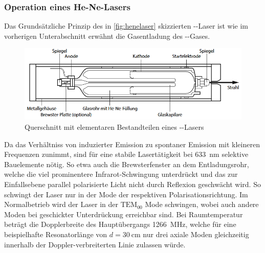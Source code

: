 \subsubsection{Operation eines He-Ne-Lasers}
Das Grundsätzliche Prinzip des in \autoref{fig:henelaser} skizzierten --Laser ist wie im vorherigen Unterabschnitt erwähnt die Gasentladung des --Gases.
\begin{figure}[H]
    \centering
    \includegraphics[scale=0.7]{Ressourcen/henelaser.png}
    \caption{Querschnitt mit elementaren Bestandteilen eines --Lasers\cite{eichler}}\label{fig:henelaser}
\end{figure}
Da das Verhältniss von induzierter Emission zu spontaner Emission mit kleineren Frequenzen zunimmt, sind für eine stabile Lasertätigkeit bei \SI{633}{\nano\meter} selektive Bauelemente nötig.
So etwa auch die Brewsterfenster an dem Entladungsrohr, welche die viel prominentere Infrarot-Schwingung unterdrückt und das zur Einfallsebene parallel polarisierte Licht nicht durch Reflexion geschwächt wird. So schwingt der Laser nur in der Mode der respektiven Polarisationsrichtung.
Im Normalbetrieb wird der Laser in der $\mathrm{TEM_{00}}$ Mode schwingen, wobei auch andere Moden bei geschickter Unterdrückung erreichbar sind. Bei Raumtemperatur beträgt die Dopplerbreite des Hauptübergangs \SI{1266}{\mega\hertz}, welche für eine beispielhafte Resonatorlänge von $d=\SI{30}{\centi\meter}$ nur drei axiale Moden gleichzeitig innerhalb der Doppler-verbreiterten Linie zulassen würde.